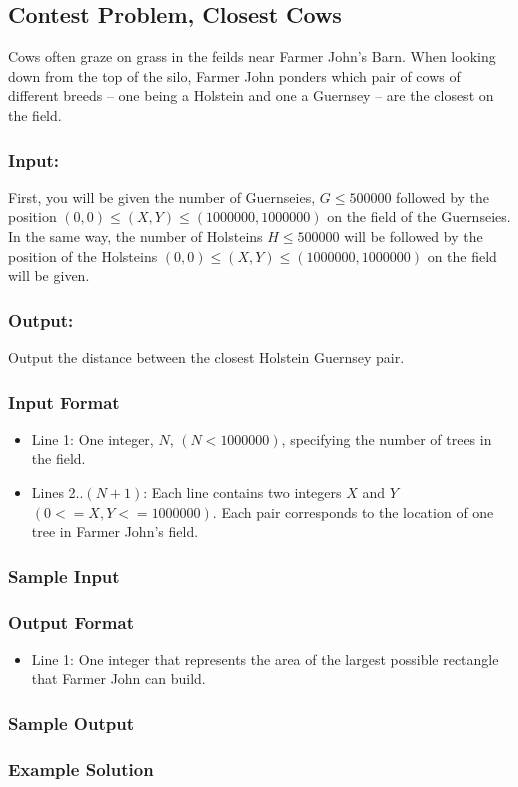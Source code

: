 \subsection{Contest Problem, Closest Cows}
Cows often graze on grass in the feilds near Farmer John's Barn.
When looking down from the top of the silo, Farmer John ponders which pair of cows of different breeds -- one being a Holstein and one a Guernsey -- are the closest on the field.
\subsubsection{Input:} First, you will be given the number of Guernseies, $ G \leq 500000$ followed by the position $(0,0) \leq (X,Y) \leq (1000000,1000000)$ on the field of the Guernseies.
In the same way, the number of Holsteins $H \leq 500000$ will be followed by the position of the Holsteins $(0,0) \leq (X,Y) \leq (1000000,1000000)$ on the field will be given.
\subsubsection{Output:} Output the distance between the closest Holstein Guernsey pair.
\subsubsection{Input Format}
\begin{itemize}
  \item Line 1: One integer, $N$, $(N < 1000000)$, specifying the number of trees in the field.
  \item Lines 2..$(N+1)$: Each line contains two integers $X$ and $Y$ $(0 <= X,Y <= 1000000)$.
        Each pair corresponds to the location of one tree in Farmer John's field.
\end{itemize}

\subsubsection{Sample Input}


\subsubsection{Output Format}
\begin{itemize}
  \item Line 1: One integer that represents the area of the largest possible rectangle that Farmer John can build.
\end{itemize}

\subsubsection{Sample Output}


\subsubsection{Example Solution}

